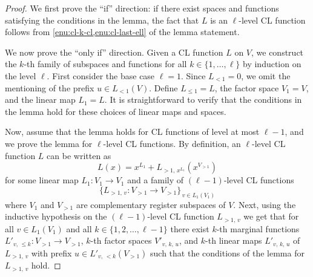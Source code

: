 \documentclass[11pt]{article}
\theoremstyle{definition}
\begin{document}
\begin{proof}
	We first prove the ``if'' direction: if there exist spaces and functions
  satisfying the conditions in the lemma, the fact that $L$ is an $\ell$-level
  CL function follows from \cref{enu:cl-k-cl,enu:cl-last-ell} of the lemma
  statement.

  We now prove the ``only if'' direction.
  Given a CL function $L$ on $V$, we construct the $k$-th family of subspaces
  and functions for all $k \in \{1, \ldots, \ell\}$ by induction on the level
  $\ell$.
  First consider the base case $\ell=1$.
  Since $L_{<1} = 0$, we omit the mentioning of the prefix $u \in L_{<1}(V)$.
  Define $L_{\leq 1} = L$, the factor space $V_1 = V$, and the linear map $L_1 =
  L$.
  It is straightforward to verify that the conditions in the lemma hold for
  these choices of linear maps and spaces.
  
  Now, assume that the lemma holds for CL functions of level at most $\ell - 1$,
  and we prove the lemma for $\ell$-level CL functions.
  By definition, an $\ell$-level CL function $L$ can be written as
  \begin{equation*}
  	L(x) = x^{L_1} + L_{>1,\, x^{L_1}}(x^{V_{>1}})
  \end{equation*}
  for some linear map $L_1 : V_1 \to V_1$ and a family of $(\ell-1)$-level CL
  functions
  \begin{equation*}
    \bigl \{ L_{>1,\, v} : V_{>1} \to V_{>1} \bigr \}_{\, v \in L_1(V_1)}
  \end{equation*}
  where $V_1$ and $V_{>1}$ are complementary register subspaces of $V$.
  Next, using the inductive hypothesis on the $(\ell-1)$-level CL function
  $L_{>1,\, v}$ we get that for all $v \in L_1(V_1)$ and all $k \in \{1, 2,
  \ldots, \ell-1\}$ there exist $k$-th marginal functions $L'_{v,\, \le k}:
  V_{>1} \to V_{>1}$, $k$-th factor spaces $V'_{v,\, k,\, u}$, and $k$-th linear
  maps $L'_{v,\, k,\, u}$ of $L_{>1,\, v}$ with prefix $u \in L'_{v,\,
    <k}(V_{>1})$ such that the conditions of the lemma for $L_{>1,\, v}$ hold.
  

\end{proof}
\end{document}
